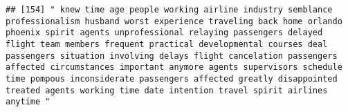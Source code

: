 \documentclass[
]{article}
\begin{document}
\begin{verbatim}
## [154] " knew time age people working airline industry semblance professionalism husband worst experience traveling back home orlando phoenix spirit agents unprofessional relaying passengers delayed flight team members frequent practical developmental courses deal passengers situation involving delays flight cancelation passengers affected circumstances important anymore agents supervisors schedule time pompous inconsiderate passengers affected greatly disappointed treated agents working time date intention travel spirit airlines anytime "                                                                                                                                                                                                                                                                                                                                                                                                                                                                                                                                                                                                                                                                                                                                                                                                                                                                                                                                                                                                                                                                                                                                                                                                                                      

\end{verbatim}
\end{document}
